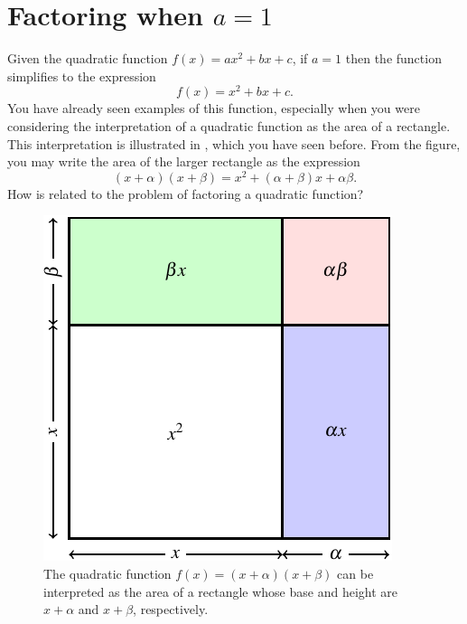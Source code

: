 \documentclass[a4paper,oneside,12pt]{article}
\begin{document}

\section{Factoring when $a = 1$}
\label{sec:quadroots:factor_quadratic_a_1}

Given the quadratic function $f(x) = ax^2 + bx + c$, if $a = 1$ then
the function simplifies to the expression
\begin{equation}
\label{eqn:quadroots:monic_quadratic_function}
f(x)
=
x^2 + bx + c.
\end{equation}
You have already seen examples of this function, especially when you
were considering the interpretation of a quadratic function as the
area of a rectangle.  This interpretation is illustrated in
, which you have seen
before.  From the figure, you may write the area of the larger
rectangle as the expression
\begin{equation}
\label{eqn:quadroots:monic_quadratic_function_factored}
(x + \alpha) (x + \beta)
=
x^2 + (\alpha + \beta)x + \alpha\beta.
\end{equation}
How is 
related to the problem of factoring a quadratic function?

\begin{figure}[!htbp]
\centering
\includegraphics[scale=1.1]{image/08/quadratic-as-square.pdf}
\caption{%
  The quadratic function $f(x) = (x + \alpha)(x + \beta)$ can be
  interpreted as the area of a rectangle whose base and height are
  $x + \alpha$ and $x + \beta$, respectively.
}
\label{fig:quadroots:quadratic_as_rectangle}
\end{figure}
\end{document}
